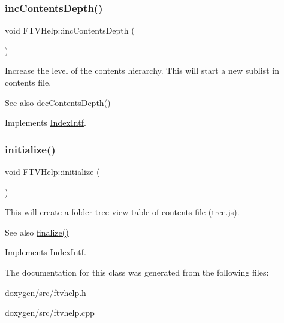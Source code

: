 \subsubsection{\texorpdfstring{incContentsDepth()}{incContentsDepth()}}
{\footnotesize\ttfamily void F\+T\+V\+Help\+::inc\+Contents\+Depth (\begin{DoxyParamCaption}{ }\end{DoxyParamCaption})\hspace{0.3cm}{\ttfamily [virtual]}}

Increase the level of the contents hierarchy. This will start a new sublist in contents file. \begin{DoxySeeAlso}{See also}
\mbox{\hyperlink{class_f_t_v_help_a5949816300bc9d6a104dfd8305aa4e6f}{dec\+Contents\+Depth()}} 
\end{DoxySeeAlso}


Implements \mbox{\hyperlink{class_index_intf}{Index\+Intf}}.

\mbox{\label{class_f_t_v_help_a791c63d8c0dc72e7fedc4f17163dbfa3}} 
\subsubsection{\texorpdfstring{initialize()}{initialize()}}
{\footnotesize\ttfamily void F\+T\+V\+Help\+::initialize (\begin{DoxyParamCaption}{ }\end{DoxyParamCaption})\hspace{0.3cm}{\ttfamily [virtual]}}

This will create a folder tree view table of contents file (tree.\+js). \begin{DoxySeeAlso}{See also}
\mbox{\hyperlink{class_f_t_v_help_a595c544e98100ca8aa84aaea4ac28e9f}{finalize()}} 
\end{DoxySeeAlso}


Implements \mbox{\hyperlink{class_index_intf}{Index\+Intf}}.



The documentation for this class was generated from the following files\+:\begin{DoxyCompactItemize}
\item 
doxygen/src/ftvhelp.\+h\item 
doxygen/src/ftvhelp.\+cpp\end{DoxyCompactItemize}
